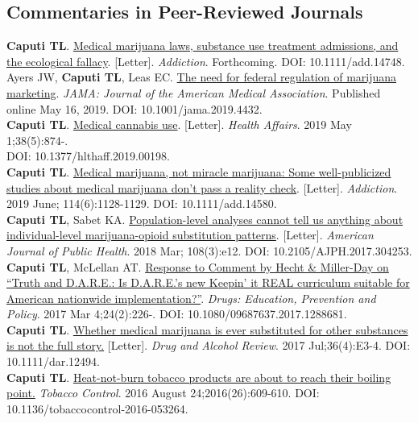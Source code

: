 \documentclass[11pt, letterpaper]{article}
\newcommand{\years}[1]{\marginnote{\normalsize #1}}
\begin{document}
\subsection*{Commentaries in Peer-Reviewed Journals}
\years{2019}\textbf{Caputi TL}. \href{http://dx.doi.org/10.1111/add.14748}{Medical marijuana laws, substance use treatment admissions, and the ecological fallacy}. [Letter]. \textit{Addiction}. Forthcoming. DOI: 10.1111/add.14748.\\[.2cm]
\years{2019}Ayers JW, \textbf{Caputi TL}, Leas EC. \href{http://dx.doi.org/10.1001/jama.2019.4432}{The need for federal regulation of marijuana marketing}. \textit{JAMA: Journal of the American Medical Association}. Published online May 16, 2019. DOI: 10.1001/jama.2019.4432.\\[.2cm]
\years{2019}\textbf{Caputi TL}. \href{http://dx.doi.org/10.1377/hlthaff.2019.00198}{Medical cannabis use}. [Letter]. \emph{Health Affairs}. 2019 May 1;38(5):874-.\\DOI: 10.1377/hlthaff.2019.00198.\\[.2cm]
\years{2019}\textbf{Caputi TL}. \href{http://dx.doi.org/10.1111/add.14580}{Medical marijuana, not miracle marijuana: Some well-publicized studies about medical marijuana don't pass a reality check}. [Letter]. \emph{Addiction}. 2019 June; 114(6):1128-1129. DOI: 10.1111/add.14580.\\[.2cm]
\years{2018}\textbf{Caputi TL}, Sabet KA. \href{http://dx.doi.org/10.2105/AJPH.2017.304253}{Population-level analyses cannot tell us anything about individual-level marijuana-opioid substitution patterns}.  [Letter]. \emph{American Journal of Public Health}. 2018 Mar; 108(3):e12. DOI: 10.2105/AJPH.2017.304253.\\[.2cm]
\clearpage
\years{2017}\textbf{Caputi TL}, McLellan AT.  \href{http://dx.doi.org/10.1080/09687637.2017.1288681}{Response to Comment by Hecht \& Miller-Day on “Truth and D.A.R.E.: Is D.A.R.E.’s new Keepin’ it REAL curriculum suitable for American nationwide implementation?”}. \textit{Drugs: Education, Prevention and Policy}. 2017 Mar 4;24(2):226-. DOI: 10.1080/09687637.2017.1288681.\\[.2cm]
\years{2016}\textbf{Caputi TL}.  \href{http://dx.doi.org/10.1111/dar.12494}{Whether medical marijuana is ever substituted for other substances is not the full story.} [Letter]. \textit{Drug and Alcohol Review}. 2017 Jul;36(4):E3-4. DOI: 10.1111/dar.12494.\\[.2cm]
\years{2016}\textbf{Caputi TL}.  \href{http://dx.doi.org/10.1136/tobaccocontrol-2016-053264}{Heat-not-burn tobacco products are about to reach their boiling point.} \textit{Tobacco Control}. 2016 August 24;2016(26):609-610. DOI: 10.1136/tobaccocontrol-2016-053264.\\[.2cm]
\end{document}
